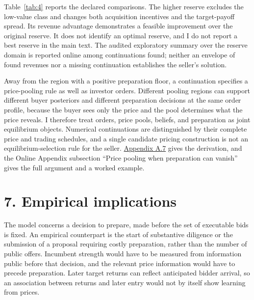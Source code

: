 \documentclass[
  12pt,
]{article}
\begin{document}
\setcounter{table}{3}
\begin{table}[tbp]\begingroup\singlespacing\small\centering
\caption{Reserve comparisons.}\label{tab:4}

\par\endgroup\end{table}

Table~\ref{tab:4} reports the declared comparisons. The higher reserve
excludes the low-value class and changes both acquisition incentives and
the target-payoff spread. Its revenue advantage demonstrates a feasible
improvement over the original reserve. It does not identify an optimal
reserve, and I do not report a best reserve in the main text. The
audited exploratory summary over the reserve domain is reported online
among continuations found; neither an envelope of found revenues nor a
missing continuation establishes the seller's solution.

Away from the region with a positive preparation floor, a continuation
specifies a price-pooling rule as well as investor orders. Different
pooling regions can support different buyer posteriors and different
preparation decisions at the same order profile, because the buyer sees
only the price and the pool determines what the price reveals. I
therefore treat orders, price pools, beliefs, and preparation as joint
equilibrium objects. Numerical continuations are distinguished by their
complete price and trading schedules, and a single candidate pricing
construction is not an equilibrium-selection rule for the seller.
\hyperref[pa-design]{Appendix A.7} gives the derivation, and the Online
Appendix subsection ``Price pooling when preparation can vanish'' gives
the full argument and a worked example.

\section{7. Empirical implications}\label{sec-program}

The model concerns a decision to prepare, made before the set of
executable bids is fixed. An empirical counterpart is the start of
substantive diligence or the submission of a proposal requiring costly
preparation, rather than the number of public offers. Incumbent strength
would have to be measured from information public before that decision,
and the relevant price information would have to precede preparation.
Later target returns can reflect anticipated bidder arrival, so an
association between returns and later entry would not by itself show
learning from prices.
\end{document}
